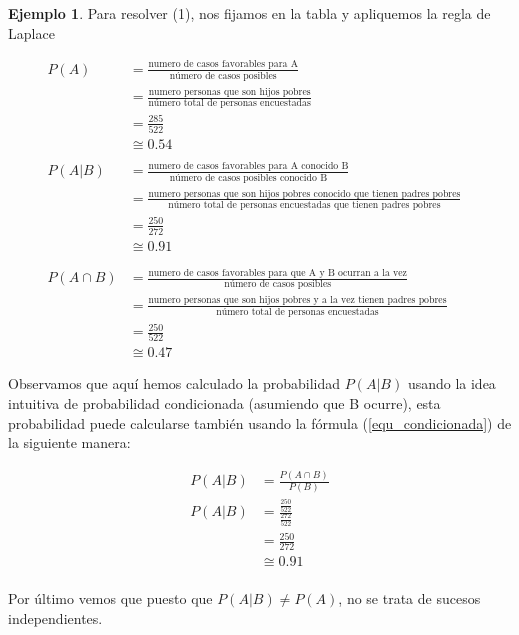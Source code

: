 \documentclass[]{book}
\theoremstyle{plain}
\theoremstyle{definition}
\newtheorem{example}[theorem]{Ejemplo}
\theoremstyle{definition} %
\begin{document}
\begin{example}
  Para resolver (1), nos fijamos en la tabla y apliquemos la regla de Laplace 

  \begin{align*}
    P(A)&=\frac{\text{numero de casos favorables para A}}{\text{número de casos posibles}}\\
    &=\frac{\text{numero personas que son hijos pobres}}{\text{número total de personas encuestadas}}\\
    &=\frac{285}{522}\\
    &\cong 0.54
    &\\
    &\\
    P(A|B)&=\frac{\text{numero de casos favorables para A conocido B}}{\text{número de casos posibles conocido B}}\\
    &=\frac{\text{numero personas que son hijos pobres conocido que tienen padres pobres}}{\text{número total de personas encuestadas que tienen padres pobres}}\\
    &=\frac{250}{272}\\
    &\cong 0.91\\
    &\\
    &\\
    P(A\cap B)&=\frac{\text{numero de casos favorables para que A y B ocurran a la vez}}{\text{número de casos posibles}}\\
    &=\frac{\text{numero personas que son hijos pobres y a la vez tienen padres pobres}}{\text{número total de personas encuestadas}}\\
    &=\frac{250}{522}\\
    &\cong 0.47
  \end{align*}

  Observamos que aquí hemos calculado la probabilidad $P(A|B)$ usando la idea intuitiva de probabilidad condicionada (asumiendo que B ocurre), 
  esta probabilidad puede calcularse también usando la fórmula (\ref{equ_condicionada}) de la siguiente manera:

  \begin{align*}
    P(A|B)&= \frac{P(A\cap B)}{P(B)}\\
    P(A|B)&=\frac{\frac{250}{522}}{\frac{272}{522}}\\
    &=\frac{250}{272}\\
    &\cong 0.91\\  
  \end{align*}

  Por último vemos que puesto que $P(A|B) \not = P(A)$, no se trata de sucesos independientes.
\end{example}
\end{document}
